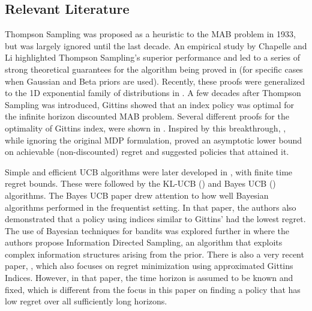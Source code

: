 \subsection{Relevant Literature}
Thompson Sampling \cite{thompson1933likelihood} was proposed as a heuristic to the MAB problem in 1933, but was largely ignored until the last decade. An empirical study by Chapelle and Li \cite{chapelle2011empirical} highlighted Thompson Sampling's superior performance and led to a series of strong theoretical guarantees for the algorithm being proved in \cite{agrawalanalysis,agrawal2013further,kaufmann2012thompson} (for specific cases when Gaussian and Beta priors are used). Recently, these proofs were generalized to the 1D exponential family of distributions in \cite{korda2013thompson}. A few decades after Thompson Sampling was introduced, Gittins \cite{gittins1979bandit} showed that an index policy was optimal for the infinite horizon discounted MAB problem. Several different proofs for the optimality of Gittins index, were shown in \cite{tsitsiklis1994short,weber1992gittins,whittle1980multi,bertsimas1996conservation}. Inspired by this breakthrough, \cite{lai1985asymptotically,lai1987adaptive}, while ignoring the original MDP formulation, proved an asymptotic lower bound on achievable (non-discounted) regret and suggested policies that attained it.

Simple and  efficient UCB algorithms were later developed in \cite{agrawal1995sample,auer2002finite,audibert2010regret}, with finite time regret bounds. These were followed by the KL-UCB (\cite{garivier2011kl}) and Bayes UCB (\cite{kaufmann2012thompson}) algorithms. The Bayes UCB paper drew attention to how well Bayesian algorithms performed in the frequentist setting. In that paper, the authors also demonstrated that a policy using indices similar to Gittins' had the lowest regret. The use of Bayesian techniques for bandits was explored further in \cite{russo2014learning} where the authors propose Information Directed Sampling, an algorithm that exploits complex information structures arising from the prior. There is also a very recent paper, \cite{lattimore2016regret}, which also focuses on regret minimization using approximated Gittins Indices. However, in that paper, the time horizon is assumed to be known and fixed, which is different from the focus in this paper on finding a policy that has low regret over all sufficiently long horizons.

